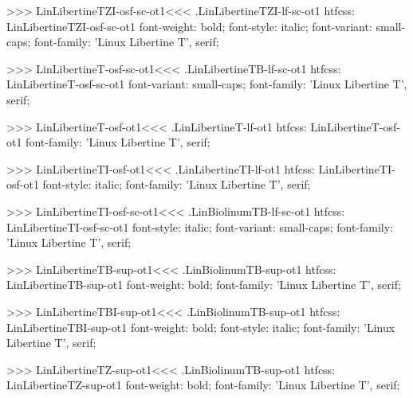 {{{{{{{>>>
\<LinLibertineTZI-osf-sc-ot1\><<<
.LinLibertineTZI-lf-sc-ot1
htfcss:  LinLibertineTZI-osf-sc-ot1  font-weight: bold; font-style: italic; font-variant: small-caps; font-family: 'Linux Libertine T', serif;

>>>
\<LinLibertineT-osf-sc-ot1\><<<
.LinLibertineTB-lf-sc-ot1
htfcss:  LinLibertineT-osf-sc-ot1  font-variant: small-caps; font-family: 'Linux Libertine T', serif;

>>>
\<LinLibertineT-osf-ot1\><<<
.LinLibertineT-lf-ot1
htfcss:  LinLibertineT-osf-ot1  font-family: 'Linux Libertine T', serif;

>>>
\<LinLibertineTI-osf-ot1\><<<
.LinLibertineTI-lf-ot1
htfcss:  LinLibertineTI-osf-ot1  font-style: italic; font-family: 'Linux Libertine T', serif;

>>>
\<LinLibertineTI-osf-sc-ot1\><<<
.LinBiolinumTB-lf-sc-ot1
htfcss:  LinLibertineTI-osf-sc-ot1  font-style: italic; font-variant: small-caps; font-family: 'Linux Libertine T', serif;

>>>
\<LinLibertineTB-sup-ot1\><<<
.LinBiolinumTB-sup-ot1
htfcss:  LinLibertineTB-sup-ot1  font-weight: bold; font-family: 'Linux Libertine T', serif;

>>>
\<LinLibertineTBI-sup-ot1\><<<
.LinBiolinumTB-sup-ot1
htfcss:  LinLibertineTBI-sup-ot1  font-weight: bold; font-style: italic; font-family: 'Linux Libertine T', serif;

>>>
\<LinLibertineTZ-sup-ot1\><<<
.LinBiolinumTB-sup-ot1
htfcss:  LinLibertineTZ-sup-ot1  font-weight: bold; font-family: 'Linux Libertine T', serif;

}}}}}}}
